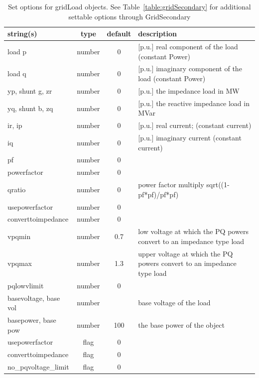 \begin{table}[ht]
\centering
\begin{tabular}{p{5cm} c c p{7cm}}
\hline
string(s) & type & default & description \\
\hline
load p & number & 0 & [p.u.] real component of the load (constant Power)\\
load q & number & 0 & [p.u.] imaginary component of the load (constant Power)\\
yp, shunt g, zr & number & 0 & [p.u.] the impedance load in MW\\
yq, shunt b, zq & number & 0 & [p.u.]  the reactive impedance load in MVar\\
ir, ip & number & 0 & [p.u.] real current; (constant current)\\
iq & number & 0 & [p.u.] imaginary current (constant current)\\
pf & number & 0 & \\
powerfactor & number & 0 & \\
qratio & number & 0 & power factor multiply  sqrt((1-pf*pf)/pf*pf)\\
usepowerfactor & number & 0 & \\
converttoimpedance & number & 0 & \\
vpqmin & number & 0.7 & low voltage at which the PQ powers convert to an impedance type load\\
vpqmax & number & 1.3 & upper voltage at which the PQ powers convert to an impedance type load\\
pqlowvlimit & number & 0 & \\
basevoltage, base vol & number &  & base voltage of the load\\
basepower, base pow & number & 100 & the base power of the object\\
usepowerfactor & flag & 0 & \\
converttoimpedance & flag & 0 & \\
no\_pqvoltage\_limit & flag & 0 & \\
\hline
\end{tabular}
\caption{Set options for gridLoad objects. See Table~\ref{table:gridSecondary} for additional settable options through GridSecondary}
\label{table:gridLoad}
\end{table}
